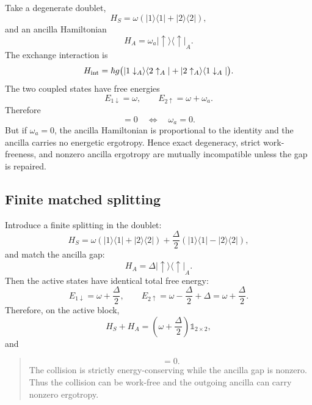 \documentclass[11pt,a4paper]{article}
\newcommand{\ket}[1]{|#1\rangle}
\newcommand{\bra}[1]{\langle #1|}
\newcommand{\proj}[1]{|#1\rangle\langle #1|}
\newcommand{\id}{\mathbb{1}}
\newenvironment{resultbox}{\begin{quote}\small}{\end{quote}}
\begin{document}
Take a degenerate doublet,
\begin{equation}
H_S=\omega(\proj{1}+\proj{2}),
\end{equation}
and an ancilla Hamiltonian
\begin{equation}
H_A=\omega_a\proj{\uparrow}_A.
\end{equation}
The exchange interaction is
\begin{equation}
H_{\rm int}=\hbar g\bigl(\ket{1\downarrow_A}\bra{2\uparrow_A}+\ket{2\uparrow_A}\bra{1\downarrow_A}\bigr).
\end{equation}
The two coupled states have free energies
\begin{equation}
E_{1\downarrow}=\omega,
\qquad
E_{2\uparrow}=\omega+\omega_a.
\end{equation}
Therefore
\begin{equation}
[H_S+H_A,H_{\rm int}]=0
\quad\Longleftrightarrow\quad
\omega_a=0.
\end{equation}
But if $\omega_a=0$, the ancilla Hamiltonian is proportional to the identity and the ancilla carries no energetic ergotropy. Hence exact degeneracy, strict work-freeness, and nonzero ancilla ergotropy are mutually incompatible unless the gap is repaired.

\subsection{Finite matched splitting}

Introduce a finite splitting in the doublet:
\begin{equation}
H_S=\omega(\proj{1}+\proj{2})+\frac{\Delta}{2}(\proj{1}-\proj{2}),
\end{equation}
and match the ancilla gap:
\begin{equation}
H_A=\Delta\proj{\uparrow}_A.
\end{equation}
Then the active states have identical total free energy:
\begin{equation}
E_{1\downarrow}=\omega+\frac{\Delta}{2},
\qquad
E_{2\uparrow}=\omega-\frac{\Delta}{2}+\Delta=\omega+\frac{\Delta}{2}.
\end{equation}
Therefore, on the active block,
\begin{equation}
H_S+H_A=\left(\omega+\frac{\Delta}{2}\right)\id_{2\times2},
\end{equation}
and
\begin{resultbox}
\begin{equation}
[H_S+H_A,H_{\rm int}]=0.
\end{equation}
The collision is strictly energy-conserving while the ancilla gap is nonzero. Thus the collision can be work-free and the outgoing ancilla can carry nonzero ergotropy.
\end{resultbox}
\end{document}
